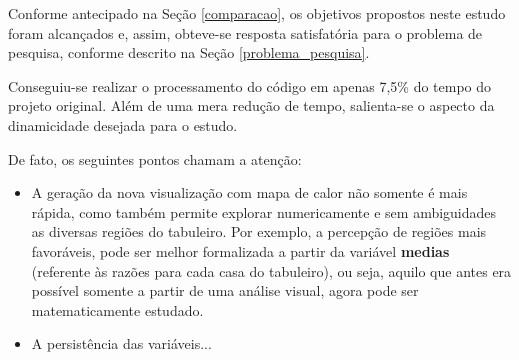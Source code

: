\documentclass[12pt]{article}
\begin{document}
Conforme antecipado na Seção \ref{comparacao}, os objetivos propostos neste estudo foram alcançados e, assim, obteve-se resposta satisfatória para o problema de pesquisa, conforme descrito na Seção \ref{problema_pesquisa}.

Conseguiu-se realizar o processamento do código em apenas 7,5\% do tempo do projeto original. Além de uma mera redução de tempo, salienta-se o aspecto da dinamicidade desejada para o estudo. 

De fato, os seguintes pontos chamam a atenção:

\begin{itemize}
	\item A geração da nova visualização com mapa de calor não somente é mais rápida, como também permite explorar numericamente e sem ambiguidades as diversas regiões do tabuleiro. Por exemplo, a percepção de regiões mais favoráveis, pode ser melhor formalizada a partir da variável \textbf{medias} (referente às razões para cada casa do tabuleiro), ou seja, aquilo que antes era possível somente a partir de uma análise visual, agora pode ser matematicamente estudado.
	
	\item A persistência das variáveis...
\end{itemize}






\end{document}
